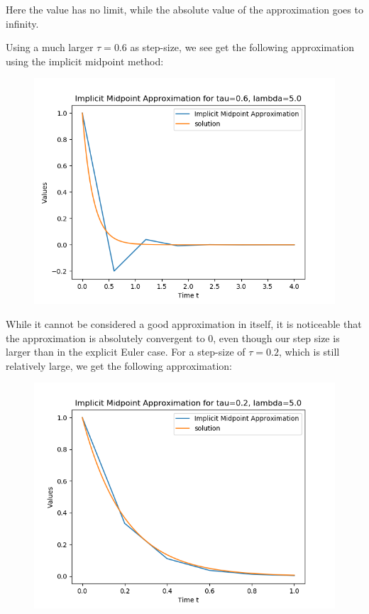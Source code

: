 \documentclass{article}
\theoremstyle{definition}
\begin{document}
\begin{itemize}
\begin{figure}[H]
		\end{figure}
		Here the value has no limit, while the absolute value of the
		approximation goes to infinity.

		Using a much larger $\tau = 0.6$ as step-size, we see get the
		following approximation using
		the implicit midpoint method:
		\begin{figure}[H]
			\includegraphics[scale=0.6]{implicit_mid_06}
		\end{figure}
		While it cannot be considered a good approximation in itself, it
		is noticeable that the approximation is absolutely convergent to
		$0$, even though our step size is larger than in the explicit
		Euler case. For a step-size of $\tau=0.2$, which is still
		relatively large, we get the following approximation:
		\begin{figure}[H]
			\includegraphics[scale=0.6]{implicit_mid_02}

\end{figure}
\end{itemize}
\end{document}
